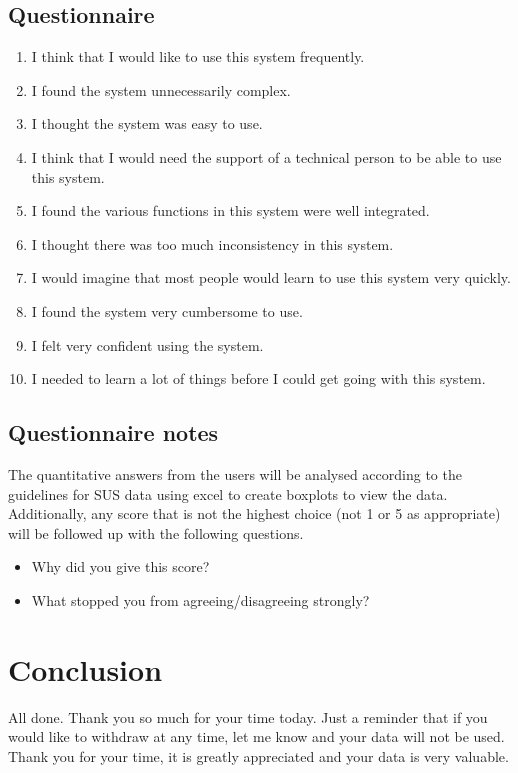\documentclass[a4 paper, 10pt]{article}
\begin{document}
    \subsection*{Questionnaire}
    \begin{multicols}{2}
        
    
        \begin{enumerate}
            \item I think that I would like to use this system frequently.
            \item I found the system unnecessarily complex.
            \item I thought the system was easy to use.
            \item I think that I would need the support of a technical person to be able to use this system.
            \item I found the various functions in this system were well integrated.
            \item I thought there was too much inconsistency in this system.
            \item I would imagine that most people would learn to use this system very quickly.
            \item I found the system very cumbersome to use.
            \item I felt very confident using the system.
            \item I needed to learn a lot of things before I could get going with this system.
        \end{enumerate}
    \end{multicols}

    \subsection*{Questionnaire notes}
        The quantitative answers from the users will be analysed according to the guidelines for SUS data using excel to create boxplots to view the data. Additionally, any score that is not the highest choice (not 1 or 5 as appropriate) will be followed up with the following questions.
        \begin{itemize}
            \item Why did you give this score?
            \item What stopped you from agreeing/disagreeing strongly?
        \end{itemize}


\section*{Conclusion}
    \begin{itshape}
        All done. Thank you so much for your time today. Just a reminder that if you would like to withdraw at any time, let me know and your data will not be used. Thank you for your time, it is greatly appreciated and your data is very valuable.
    \end{itshape}
\end{document}
